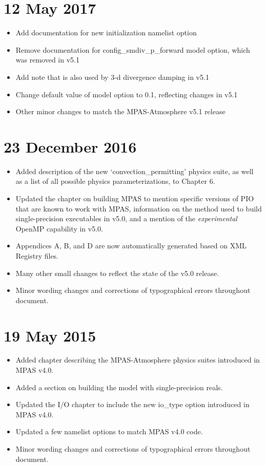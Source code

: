 \section*{12 May 2017}

\begin{itemize}
\item Add documentation for new  initialization namelist option
\item Remove documentation for config\_smdiv\_p\_forward model option, which was removed in v5.1
\item Add note that  is also used by 3-d divergence damping in v5.1
\item Change default value of  model option to 0.1, reflecting changes in v5.1
\item Other minor changes to match the MPAS-Atmosphere v5.1 release
\end{itemize}

\section*{23 December 2016}

\begin{itemize}
\item Added description of the new `convection\_permitting' physics suite, as well as
a list of all possible physics parameterizations, to Chapter 6.
\item Updated the chapter on building MPAS to mention specific versions of PIO that are known
to work with MPAS, information on the method used to build single-precision executables in v5.0,
and a mention of the {\em experimental} OpenMP capability in v5.0.
\item Appendices A, B, and D are now automatically generated based on XML Registry files.
\item Many other small changes to reflect the state of the v5.0 release.
\item Minor wording changes and corrections of typographical errors throughout document.
\end{itemize}

\section*{19 May 2015}

\begin{itemize}
\item Added chapter describing the MPAS-Atmosphere physics suites introduced in MPAS v4.0.
\item Added a section on building the model with single-precision reals.
\item Updated the I/O chapter to include the new io\_type option introduced in MPAS v4.0.
\item Updated a few namelist options to match MPAS v4.0 code.
\item Minor wording changes and corrections of typographical errors throughout document.
\end{itemize}

